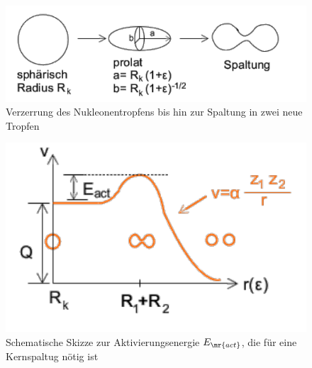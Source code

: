 \begin{figure}[!ht]
	\centering
	\includegraphics[width=.6\textwidth]{imgs/ep5-fig-5-15.pdf}
	\caption{Verzerrung des \glqq Nukleonentropfens\grqq{} bis hin zur Spaltung in zwei neue \glqq Tropfen\grqq \label{fig:5.15}}
	\end{figure}

\begin{figure}[!ht]
	\centering
	\includegraphics[width=.5\textwidth]{imgs/ep5-fig-5-16.pdf}
	\caption{Schematische Skizze zur Aktivierungsenergie $E_\mr{act}$, die für eine Kernspaltug nötig ist \label{fig:5.16}}
\end{figure}


